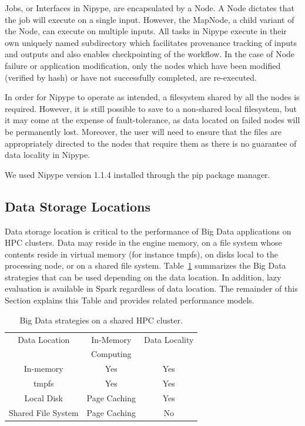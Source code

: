 Jobs, or Interfaces in Nipype, are encapsulated by a Node. A Node dictates that
the job will execute on a single input. However, the MapNode, 
a child variant of the Node, can execute on multiple inputs. All tasks in
Nipype execute in their own uniquely named subdirectory which facilitates provenance 
tracking of inputs and outputs and also enables checkpointing of the workflow.
In the case of Node failure or application modification, only the nodes which have
been modified (verified by hash) or have not successfully completed, are re-executed.

In order for Nipype to operate as intended, a filesystem shared by all the nodes 
is required. However, it is still possible to save to a non-shared 
local filesystem, but it may come at the expense of fault-tolerance, as data 
located on failed nodes will be permanently lost. Moreover, the 
user will need to ensure that the files are appropriately directed to 
the nodes that require them as there is no guarantee of data locality 
in Nipype.

We used Nipype version 1.1.4 installed through the pip package manager.

\subsection{Data Storage Locations}

Data storage location is critical to the performance of Big Data 
applications on HPC clusters.
Data may reside in the engine memory, on 
a file system whose contents reside in virtual memory (for instance 
tmpfs), on disks local to the processing node, or on a shared 
file system. Table~\ref{table:features} summarizes the Big Data 
strategies that can be used depending on the data location. In 
addition, lazy evaluation is available in Spark regardless of data 
location. The remainder of this Section explains this Table and 
provides related performance models.

\begin{table}
\centering
\begin{tabular}{c|cc}
   \rowcolor{headcolor}
    Data Location                 & In-Memory     & Data Locality        \\
    \rowcolor{headcolor}
                                  & Computing     &                     \\
                                  \hline          
In-memory                         & \cellcolor{green!25} Yes           & \cellcolor{green!25}Yes                      \\
tmpfs                             & \cellcolor{green!25} Yes           & \cellcolor{green!25}Yes                  \\
Local Disk                        & \cellcolor{orange!25}Page Caching  & \cellcolor{green!25}Yes                  \\
Shared File System                & \cellcolor{orange!25}Page Caching  & \cellcolor{red!25}No                
\end{tabular}
\setlength{\belowcaptionskip}{-10pt}
\caption{Big Data strategies on a shared HPC cluster.}
\label{table:features}
\end{table}

